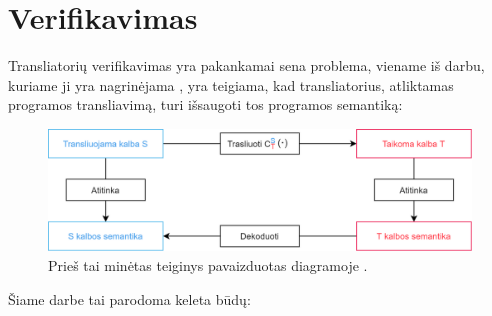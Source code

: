 \documentclass{VUMIFPSbakalaurinis}
\begin{document}
\section{Verifikavimas} \label{verifikavimas}
Transliatorių verifikavimas yra pakankamai sena problema, viename iš darbu, kuriame ji yra nagrinėjama \cite{compilerCorrectness}, yra teigiama, kad transliatorius, atliktamas programos transliavimą, turi išsaugoti tos programos semantiką:
\begin{figure}[H]
	\centering
	\includegraphics[scale=0.85]{corect.png}
	\caption{Prieš tai minėtas teiginys pavaizduotas diagramoje \cite{compilerCorrectness}.}
	\centering
	\end{figure}
	 Šiame darbe tai parodoma keleta būdų:
\end{document}
